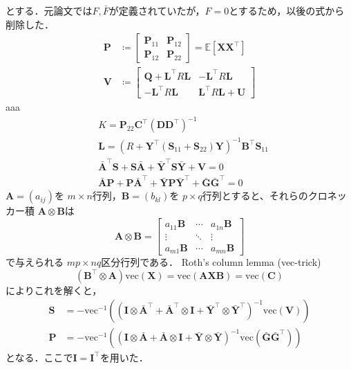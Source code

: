 とする．元論文では$F, \bar{F}$が定義されていたが，$F=0$とするため，以後の式から削除した．
\begin{align}
\mathbf{P} &\coloneqq \begin{bmatrix}
\mathbf{P}_{11} & \mathbf{P}_{12} \\
\mathbf{P}_{12} & \mathbf{P}_{22}
\end{bmatrix} = \mathbb{E}\left[\mathbf{X} \mathbf{X}^\top\right] \\
\mathbf{V} &\coloneqq \begin{bmatrix}
\mathbf{Q}+\mathbf{L}^\top R \mathbf{L} & -\mathbf{L}^\top R \mathbf{L} \\
-\mathbf{L}^\top R \mathbf{L} & \mathbf{L}^\top R \mathbf{L}+\mathbf{U}
\end{bmatrix}
\end{align}
aaa
\begin{align}
&K=\mathbf{P}_{22} \mathbf{C}^\top\left(\mathbf{D} \mathbf{D}^\top\right)^{-1} \\
&\mathbf{L}=\left(R+\mathbf{Y}^\top\left(\mathbf{S}_{11}+\mathbf{S}_{22}\right) \mathbf{Y}\right)^{-1} \mathbf{B}^\top \mathbf{S}_{11} \\
&\bar{\mathbf{A}}^\top \mathbf{S}+\mathbf{S} \bar{\mathbf{A}}+\bar{\mathbf{Y}}^\top \mathbf{S} \bar{\mathbf{Y}}+\mathbf{V}=0 \\
&\bar{\mathbf{A}} \mathbf{P}+\mathbf{P} \bar{\mathbf{A}}^\top+\bar{\mathbf{Y}} \mathbf{P} \bar{\mathbf{Y}}^\top+\bar{\mathbf{G}} \bar{\mathbf{G}}^\top=0
\end{align}
$\mathbf{A} = (a_{ij})$を $m \times n$行列，$\mathbf{B} = (b_{kl})$を $p \times q$行列とすると、それらのクロネッカー積 $\mathbf{A} \otimes \mathbf{B}$は
\begin{equation}
\mathbf{A}\otimes \mathbf{B}={\begin{bmatrix}a_{11}\mathbf{B}&\cdots &a_{1n}\mathbf{B}\\\vdots &\ddots &\vdots \\a_{m1}\mathbf{B}&\cdots &a_{mn}\mathbf{B}\end{bmatrix}}
\end{equation}
で与えられる $mp \times nq$区分行列である．
Roth's column lemma (vec-trick) 
\begin{equation}
(\mathbf{B}^\top \otimes \mathbf{A})\text{vec}(\mathbf{X}) = \text{vec}(\mathbf{A}\mathbf{X}\mathbf{B})=\text{vec}(\mathbf{C})
\end{equation}
によりこれを解くと，
\begin{align}
\mathbf{S} &= -\text{vec}^{-1}\left(\left(\mathbf{I} \otimes \bar{\mathbf{A}}^\top + \bar{\mathbf{A}}^\top \otimes \mathbf{I} + \bar{\mathbf{Y}}^\top \otimes \bar{\mathbf{Y}}^\top\right)^{-1}\text{vec}(\mathbf{V})\right)\\
\mathbf{P} &= -\text{vec}^{-1}\left(\left(\mathbf{I} \otimes \bar{\mathbf{A}} + \bar{\mathbf{A}} \otimes \mathbf{I} + \bar{\mathbf{Y}} \otimes \bar{\mathbf{Y}}\right)^{-1}\text{vec}(\bar{\mathbf{G}}\bar{\mathbf{G}}^\top)\right)
\end{align}
となる．ここで$\mathbf{I}=\mathbf{I}^\top$を用いた．
